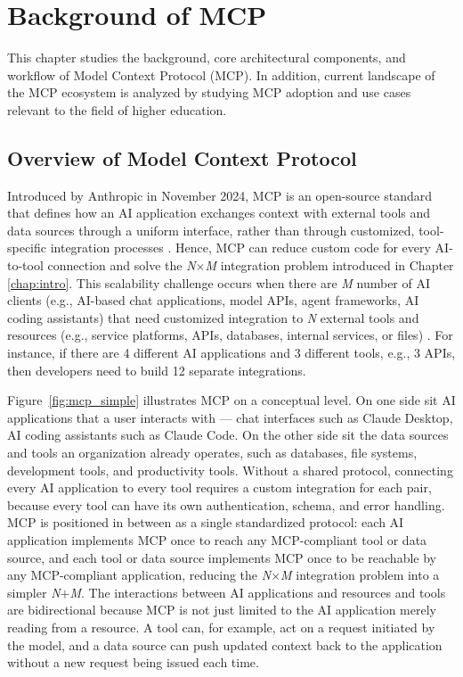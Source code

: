\documentclass[english, 12pt, a4paper, elec, utf8, a-2b, online]{aaltothesis}
\begin{document}

\clearpage
\section{Background of MCP}
\label{chap:mcp_background}
This chapter studies the background, core architectural components, and workflow of Model Context Protocol (MCP). 
In addition, current landscape of the MCP ecosystem is analyzed by studying MCP adoption and use cases relevant to the field of higher education.

\subsection{Overview of Model Context Protocol}
Introduced by Anthropic in November 2024, MCP is an open-source standard that defines how an AI application exchanges context with external tools and data sources through a uniform interface, rather than through customized, tool-specific integration processes \cite{anthropic_mcp_intro}.
Hence, MCP can reduce custom code for every AI-to-tool connection and solve the \textit{N$\times$M} integration problem introduced in Chapter \ref{chap:intro}. 
This scalability challenge occurs when there are \textit{M} number of AI clients (e.g., AI-based chat applications, model APIs, agent frameworks, AI coding assistants) that need customized integration to \textit{N} external tools and resources (e.g., service platforms, APIs, databases, internal services, or files) \cite{ray2025survey}. 
For instance, if there are 4 different AI applications and 3 different tools, e.g., 3 APIs, then developers need to build 12 separate integrations.

Figure~\ref{fig:mcp_simple} illustrates MCP on a conceptual level. 
On one side sit AI applications that a user interacts with — chat interfaces such as Claude Desktop, AI coding assistants such as Claude Code. 
On the other side sit the data sources and tools an organization already operates, such as databases, file systems, development tools, and productivity tools. 
Without a shared protocol, connecting every AI application to every tool requires a custom integration for each pair, because every tool can have its own authentication, schema, and error handling.
MCP is positioned in between as a single standardized protocol: each AI application implements MCP once to reach any MCP-compliant tool or data source, and each tool or data source implements MCP once to be reachable by any MCP-compliant application, reducing the \textit{N$\times$M} integration problem into a simpler \textit{N$+$M}.
The interactions between AI applications and resources and tools are bidirectional because MCP is not just limited to the AI application merely reading from a resource. 
A tool can, for example, act on a request initiated by the model, and a data source can push updated context back to the application without a new request being issued each time.
\end{document}
